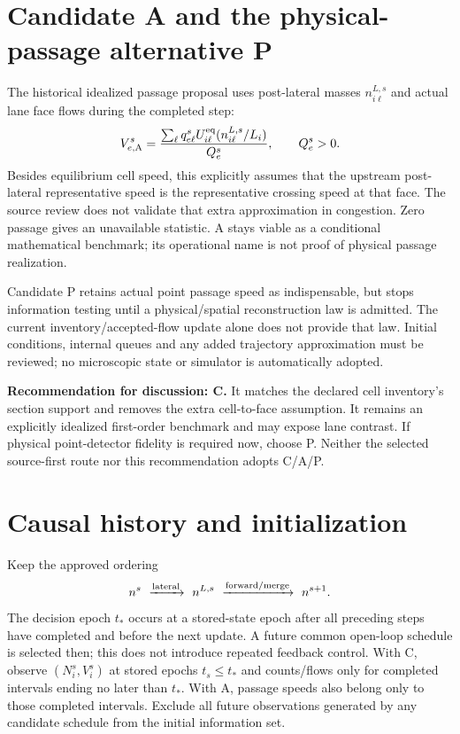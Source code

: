 \documentclass[10pt,a4paper]{article}
\begin{document}
\section{Candidate A and the physical-passage alternative P}
The historical idealized passage proposal uses post-lateral masses
$n_{i\ell}^{L,s}$ and actual lane face flows during the completed step:
\begin{equation}
V_{e,\rm A}^s=
\frac{\sum_\ell q_{e\ell}^s
U_{i\ell}^{\rm eq}(n_{i\ell}^{L,s}/L_i)}{Q_e^s},\qquad Q_e^s>0.
\end{equation}
Besides equilibrium cell speed, this explicitly assumes that the upstream
post-lateral representative speed is the representative crossing speed at
that face. The source review does not validate that extra approximation in
congestion. Zero passage gives an unavailable statistic. A stays viable as
a conditional mathematical benchmark; its operational name is not proof
of physical passage realization.

Candidate P retains actual point passage speed as indispensable, but stops
information testing until a physical/spatial reconstruction law is admitted.
The current inventory/accepted-flow update alone does not provide that law.
Initial conditions, internal queues and any added trajectory approximation
must be reviewed; no microscopic state or simulator is automatically adopted.

\textbf{Recommendation for discussion: C.} It matches the declared cell
inventory's section support and removes the extra cell-to-face assumption.
It remains an explicitly idealized first-order benchmark and may expose lane
contrast. If physical point-detector fidelity is required now, choose P.
Neither the selected source-first route nor this recommendation adopts C/A/P.
\newpage

\section{Causal history and initialization}
Keep the approved ordering
\begin{equation}
n^s\ \xrightarrow{\rm lateral}\ n^{L,s}\
\xrightarrow{\rm forward/merge}\ n^{s+1}.
\end{equation}
The decision epoch $t_*$ occurs at a stored-state epoch after all preceding
steps have completed and before the next update. A future common open-loop
schedule is selected then; this does not introduce repeated feedback control.
With C, observe $(N_i^s,V_i^s)$ at stored epochs $t_s\leq t_*$ and counts/flows
only for completed intervals ending no later than $t_*$. With A, passage speeds
also belong only to those completed intervals. Exclude all future observations
generated by any candidate schedule from the initial information set.
\end{document}
